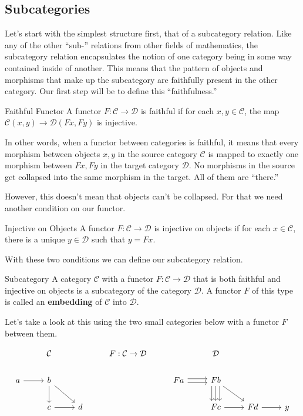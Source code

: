 \documentclass[12pt]{article}
\begin{document}
\subsection*{Subcategories}
Let's start with the simplest structure first, that of a subcategory relation.
Like any of the other ``sub-'' relations from other fields of mathematics, the subcategory relation encapsulates the notion of one category being in some way contained inside of another.
This means that the pattern of objects and morphisms that make up the subcategory are faithfully present in the other category.
Our first step will be to define this ``faithfulness.''

\begin{definition}{Faithful Functor}{}
  A functor $F:\mathcal{C}\rightarrow\mathcal{D}$ is faithful if for each $x,y\in\mathcal{C}$, the map $\mathcal{C}(x, y)\rightarrow\mathcal{D}(Fx,Fy)$ is injective.
\end{definition}
In other words, when a functor between categories is faithful, it means that every morphism between objects $x,y$ in the source category $\mathcal{C}$ is mapped to exactly one morphism between $Fx, Fy$ in the target category $\mathcal{D}$.
No morphisms in the source get collapsed into the same morphism in the target.
All of them are ``there.''

However, this doesn't mean that objects can't be collapsed.
For that we need another condition on our functor.

\begin{definition}{Injective on Objects}{}
  A functor $F:\mathcal{C}\rightarrow\mathcal{D}$ is injective on objects if for each $x\in\mathcal{C}$, there is a unique $y\in\mathcal{D}$ such that $y=Fx$.
\end{definition}

With these two conditions we can define our subcategory relation.

\begin{definition}{Subcategory}{}
  A category $\mathcal{C}$ with a functor $F:\mathcal{C}\rightarrow\mathcal{D}$ that is both faithful and injective on objects is a subcategory of the category $\mathcal{D}$.
  A functor $F$ of this type is called an \textbf{embedding} of $\mathcal{C}$ into $\mathcal{D}$.
\end{definition}

Let's take a look at this using the two small categories below with a functor $F$ between them.

\[\begin{tikzcd}
    & {\mathcal{C}} && {F:\mathcal{C}\rightarrow\mathcal{D}} && {\mathcal{D}} \\
    a & b &&& Fa & Fb \\
    & c & d &&& Fc & Fd & y
    \arrow[from=2-1, to=2-2]
    \arrow[from=2-2, to=3-2]
    \arrow[from=3-2, to=3-3]
    \arrow[from=2-2, to=3-3]
    \arrow[shift left, from=2-5, to=2-6]
    \arrow[shift left=2, from=2-6, to=3-6]
    \arrow[from=2-6, to=3-7]
    \arrow[from=3-6, to=3-7]
    \arrow[shift right, from=2-5, to=2-6]
    \arrow[shift right=2, from=2-6, to=3-6]
    \arrow[from=2-6, to=3-6]
    \arrow[from=3-7, to=3-8]
  \end{tikzcd}\]
\end{document}
